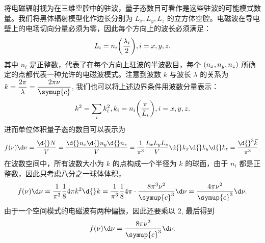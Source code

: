 \documentclass[../天体物理基础.tex]{subfiles}
\begin{document}
将电磁辐射视为在三维空腔中的驻波，量子态数目可看作是这些驻波的可能模式数量。我们将黑体辐射模型化作边长分别为 $L_{x}, L_{y}, L_{z}$ 的立方体空腔。电磁波在导电壁上的电场切向分量必须为零，因此每个方向上的波长必须满足：
\begin{equation}
L_{i}=n_{i}\mleft(\frac{\lambda_{i}}{2}\mright), i=x, y, z.
\end{equation}
其中 $n_{i}$ 是正整数，代表了在每个方向上驻波的半波数目，每个 $\mleft(n_{x}, n_{y}, n_{z}\mright)$ 所确定的点都代表一种允许的电磁波模式。注意到波数 $k$ 与波长 $\lambda$ 的关系为 $k=\dfrac{2\pi{}}{\lambda}=\dfrac{2\pi\nu}{\symup{c}}$, 我们也可以将上述边界条件用波数分量表示：
\begin{equation}
k^{2}=\sum_{i}k_{i}^{2}, k_{i}=n_{i}\mleft(\frac{\pi}{L_{i}}\mright), i=x, y, z.
\end{equation}
进而单位体积量子态的数目可以表示为
\begin{equation}
f\mleft(\nu\mright)\d\nu=\frac{\d{}N}{V}=\frac{\d{}n_{x}\d{}n_{y}\d{}n_{z}}{V}=\frac{1}{\pi^{3}}\frac{L_{x}L_{y}L_{z}}{V}\d{}k_{x}\d{}k_{y}\d{}k_{z}=\frac{\d{}^{3}\vec{k}}{\pi^{3}}.
\end{equation}
在波数空间中，所有波数大小为 $k$ 的点构成一个半径为 $k$ 的球面，由于 $n_{i}$ 都是正整数，因此只考虑八分之一球体体积，
\begin{equation}
f\mleft(\nu\mright)\d\nu=\frac{1}{\pi^{3}}\frac{1}{8}4\pi{}k^{2}\d{}k=\frac{1}{\pi^{3}}\frac{1}{8}4\pi\cdot\frac{8\pi^{3}\nu^{2}}{\symup{c}^{3}}\d\nu=\frac{4\pi\nu^{2}}{\symup{c}^{3}}\d\nu.
\end{equation}
由于一个空间模式的电磁波有两种偏振，因此还要乘以 2, 最后得到
\begin{equation}
f\mleft(\nu\mright)\d\nu=\frac{8\pi\nu^{2}}{\symup{c}^{3}}\d\nu.
\end{equation}
\end{document}
